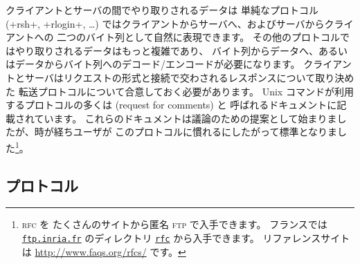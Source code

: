 クライアントとサーバの間でやり取りされるデータは
単純なプロトコル (\ml+rsh+, \ml+rlogin+, \ldots) ではクライアントからサーバへ、およびサーバからクライアントへの
二つのバイト列として自然に表現できます。
その他のプロトコルではやり取りされるデータはもっと複雑であり、
バイト列からデータへ、あるいはデータからバイト列へのデコード/エンコードが必要になります。
クライアントとサーバはリクエストの形式と接続で交わされるレスポンスについて取り決めた
転送プロトコルについて合意しておく必要があります。
Unix コマンドが利用するプロトコルの多くは  (request for comments) と
呼ばれるドキュメントに記載されています。
これらのドキュメントは議論のための提案として始まりましたが、時が経ちユーザが
このプロトコルに慣れるにしたがって標準となりました\footnote{\textsc{rfc} を
  たくさんのサイトから匿名 \textsc{ftp} で入手できます。
  フランスでは \href{ftp://ftp.inria.fr}{\texttt{ftp.inria.fr}} のディレクトリ
  \href{ftp://ftp.inria.fr/pub/rfc/}{\texttt{rfc}} から入手できます。
  リファレンスサイトは \url{http://www.faqs.org/rfcs/} です。}。

\subsection*{ プロトコル}

